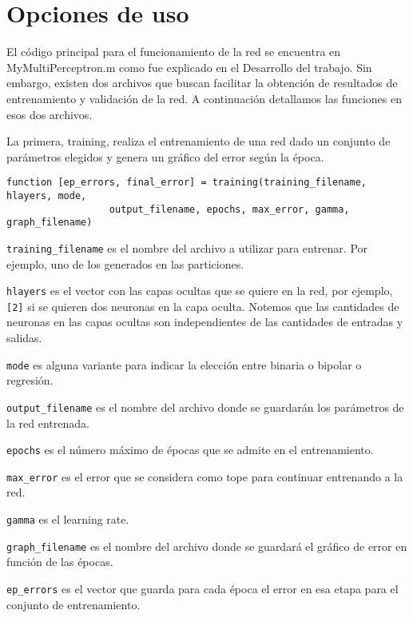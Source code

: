 \documentclass[informe.tex]{subfiles}
\begin{document}
  
  \section{Opciones de uso}
  
    El código principal para el funcionamiento de la red se encuentra en MyMultiPerceptron.m como fue explicado en el Desarrollo del trabajo. Sin embargo, existen dos archivos que buscan facilitar la obtenci\'on de resultados de entrenamiento y validaci\'on de la red. A continuaci\'on detallamos las funciones en esos dos archivos.
    
    La primera, training, realiza el entrenamiento de una red dado un conjunto de parámetros elegidos y genera un gráfico del error según la época.
    
    \verb|function [ep_errors, final_error] = training(training_filename, hlayers, mode, | \\
    \verb|                  output_filename, epochs, max_error, gamma, graph_filename)|
    
    \smallskip
    \verb|training_filename| es el nombre del archivo a utilizar para entrenar. Por ejemplo, uno de los generados en las particiones.
    
    \smallskip
    \verb|hlayers| es el vector con las capas ocultas que se quiere en la red, por ejemplo, \verb|[2]| si se quieren dos neuronas en la capa oculta. Notemos que las cantidades de neuronas en las capas ocultas son independientes de las cantidades de entradas y salidas.
    
    \smallskip
    \verb|mode| es alguna variante para indicar la elección entre binaria o bipolar o regresión.
    
    \smallskip
    \verb|output_filename| es el nombre del archivo donde se guardarán los parámetros de la red entrenada.
    
    \smallskip
    \verb|epochs| es el número máximo de épocas que se admite en el entrenamiento.
    
    \smallskip
    \verb|max_error| es el error que se considera como tope para continuar entrenando a la red.
    
    \smallskip
    \verb|gamma| es el learning rate.
    
    \smallskip
    \verb|graph_filename| es el nombre del archivo donde se guardará el gráfico de error en función de las épocas.

    \smallskip
    \verb|ep_errors| es el vector que guarda para cada época el error en esa etapa para el conjunto de entrenamiento.
    
\end{document}
